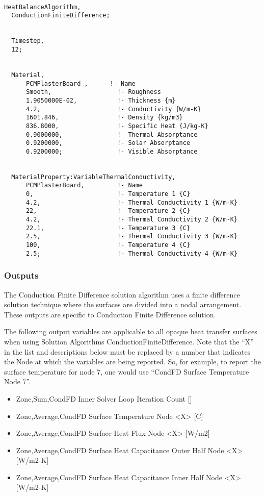\begin{lstlisting}

HeatBalanceAlgorithm,
  ConductionFiniteDifference;


  Timestep,
  12;


  Material,
      PCMPlasterBoard ,      !- Name
      Smooth,                  !- Roughness
      1.9050000E-02,           !- Thickness {m}
      4.2,                     !- Conductivity {W/m-K}
      1601.846,                !- Density {kg/m3}
      836.8000,                !- Specific Heat {J/kg-K}
      0.9000000,               !- Thermal Absorptance
      0.9200000,               !- Solar Absorptance
      0.9200000;               !- Visible Absorptance


  MaterialProperty:VariableThermalConductivity,
      PCMPlasterBoard,         !- Name
      0,                       !- Temperature 1 {C}
      4.2,                     !- Thermal Conductivity 1 {W/m-K}
      22,                      !- Temperature 2 {C}
      4.2,                     !- Thermal Conductivity 2 {W/m-K}
      22.1,                    !- Temperature 3 {C}
      2.5,                     !- Thermal Conductivity 3 {W/m-K}
      100,                     !- Temperature 4 {C}
      2.5;                     !- Thermal Conductivity 4 {W/m-K}
\end{lstlisting}

\subsubsection{Outputs}\label{outputs-1-026}

The Conduction Finite Difference solution algorithm uses a finite difference solution technique where the surfaces are divided into a nodal arrangement. These outputs are specific to Conduction Finite Difference solution.

The following output variables are applicable to all opaque heat transfer surfaces when using Solution Algorithms ConductionFiniteDifference.  Note that the ``X'' in the list and descriptions below must be replaced by a number that indicates the Node at which the variables are being reported.  So, for example, to report the surface temperature for node 7, one would use ``CondFD Surface Temperature Node 7''.

\begin{itemize}
\item
  Zone,Sum,CondFD Inner Solver Loop Iteration Count {[]}
\item
  Zone,Average,CondFD Surface Temperature Node \textless{}X\textgreater{} {[}C{]}
\item
  Zone,Average,CondFD Surface Heat Flux Node \textless{}X\textgreater{} {[}W/m2{]}
\item
  Zone,Average,CondFD Surface Heat Capacitance Outer Half Node \textless{}X\textgreater{} {[}W/m2-K{]}
\item
  Zone,Average,CondFD Surface Heat Capacitance Inner Half Node \textless{}X\textgreater{} {[}W/m2-K{]}
\end{itemize}


